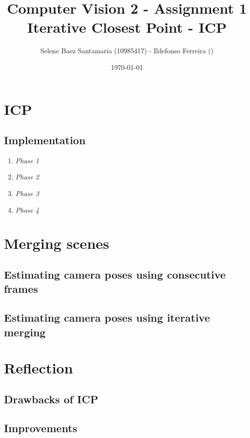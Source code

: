 \documentclass[11pt]{article}
\title{
	{Computer Vision 2 - Assignment 1\\
	 Iterative Closest Point - ICP}
}
\author{
Selene Baez Santamaria (10985417) - Ildefonso Ferreira ()}
\date{\today}
\begin{document}
\maketitle

\section{ICP}


\subsection{Implementation}

\begin{enumerate}
	\item \textit{Phase 1}
	\item \textit{Phase 2}
	\item \textit{Phase 3}
	\item \textit{Phase 4}
\end{enumerate}


\section{Merging scenes}


\subsection{Estimating camera poses using consecutive frames}



\subsection{Estimating camera poses using iterative merging}



\section{Reflection}

\subsection{Drawbacks of ICP}

\subsection{Improvements}
\end{document}

